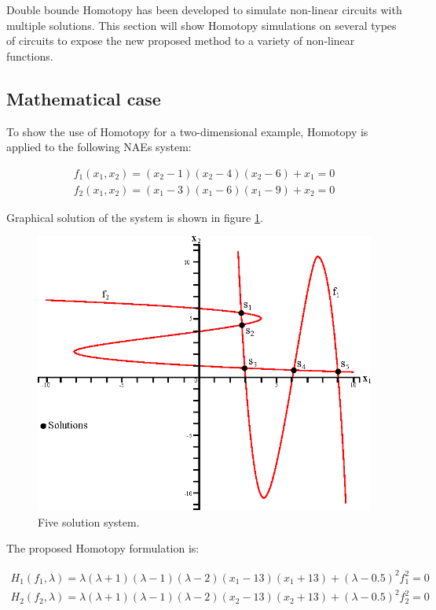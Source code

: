 \documentclass[conference,letterpaper,onecolumn]{IEEEtran}
\begin{document}
{Double bounde Homotopy has been developed to simulate non-linear circuits with multiple solutions. This section will show Homotopy simulations on several types of circuits to expose the new proposed method to a variety of non-linear functions.

\subsection{Mathematical case}

To show the use of Homotopy for a two-dimensional example, Homotopy is applied to the following NAEs system:

\begin{displaymath}
\begin{array}{c}
f_1(x_1,x_2)=(x_2-1)(x_2-4)(x_2-6)+x_1=0\\
f_2(x_1,x_2)=(x_1-3)(x_1-6)(x_1-9)+x_2=0
\end{array}
\end{displaymath}

Graphical solution of the system is shown in figure \ref{9sol}.

\begin{figure}[hbtp]
\centering
\includegraphics[scale=0.8]{chap3/figs/doblelimit_mul_1.eps}
\caption{Five solution system.}
\label{9sol}
\end{figure}

The proposed Homotopy formulation is:

\begin{displaymath}
\begin{array}{c}
H_1(f_1,\lambda)=\lambda(\lambda+1)(\lambda-1)(\lambda-2)(x_1-13)(x_1+13)+(\lambda-0.5)^2 f_1^2=0\\
H_2(f_2,\lambda)=\lambda(\lambda+1)(\lambda-1)(\lambda-2)(x_2-13)(x_2+13)+(\lambda-0.5)^2 f_2^2=0\\
\end{array}
\end{displaymath}

}
\end{document}

